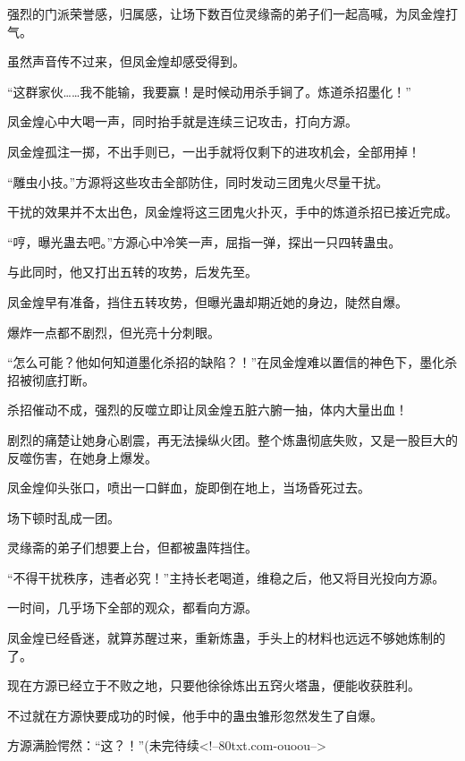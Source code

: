 \begin{this_body}
强烈的门派荣誉感，归属感，让场下数百位灵缘斋的弟子们一起高喊，为凤金煌打气。

虽然声音传不过来，但凤金煌却感受得到。

“这群家伙……我不能输，我要赢！是时候动用杀手锏了。炼道杀招墨化！”

凤金煌心中大喝一声，同时抬手就是连续三记攻击，打向方源。

凤金煌孤注一掷，不出手则已，一出手就将仅剩下的进攻机会，全部用掉！

“雕虫小技。”方源将这些攻击全部防住，同时发动三团鬼火尽量干扰。

干扰的效果并不太出色，凤金煌将这三团鬼火扑灭，手中的炼道杀招已接近完成。

“哼，曝光蛊去吧。”方源心中冷笑一声，屈指一弹，探出一只四转蛊虫。

与此同时，他又打出五转的攻势，后发先至。

凤金煌早有准备，挡住五转攻势，但曝光蛊却期近她的身边，陡然自爆。

爆炸一点都不剧烈，但光亮十分刺眼。

“怎么可能？他如何知道墨化杀招的缺陷？！”在凤金煌难以置信的神色下，墨化杀招被彻底打断。

杀招催动不成，强烈的反噬立即让凤金煌五脏六腑一抽，体内大量出血！

剧烈的痛楚让她身心剧震，再无法操纵火团。整个炼蛊彻底失败，又是一股巨大的反噬伤害，在她身上爆发。

凤金煌仰头张口，喷出一口鲜血，旋即倒在地上，当场昏死过去。

场下顿时乱成一团。

灵缘斋的弟子们想要上台，但都被蛊阵挡住。

“不得干扰秩序，违者必究！”主持长老喝道，维稳之后，他又将目光投向方源。

一时间，几乎场下全部的观众，都看向方源。

凤金煌已经昏迷，就算苏醒过来，重新炼蛊，手头上的材料也远远不够她炼制的了。

现在方源已经立于不败之地，只要他徐徐炼出五窍火塔蛊，便能收获胜利。

不过就在方源快要成功的时候，他手中的蛊虫雏形忽然发生了自爆。

方源满脸愕然：“这？！”(未完待续<!--80txt.com-ouoou-->

\end{this_body}

